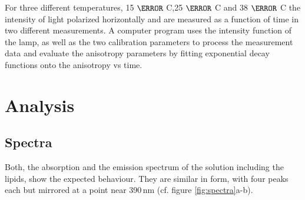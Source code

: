 \documentclass{scrartcl}
\numberwithin{equation}{section}
\numberwithin{figure}{section}
\numberwithin{table}{section}
\begin{document}
For three different temperatures, 15 $\degree$ C,25 $\degree$ C and 38 $\degree$ C the intensity of light polarized horizontally and  are measured as a function of time in two different measurements. A computer program uses the intensity function of the lamp, as well as the two calibration parameters to process the measurement data and evaluate the anisotropy parameters by fitting exponential decay functions onto the anisotropy vs time.


\clearpage

\section{Analysis}


\subsection{Spectra}
Both, the absorption and the emission spectrum of the solution including the lipids, show the expected behaviour. They are similar in form, with four peaks each but mirrored at a point near 390\,nm (cf. figure \ref{fig:spectra}a-b).
\end{document}
